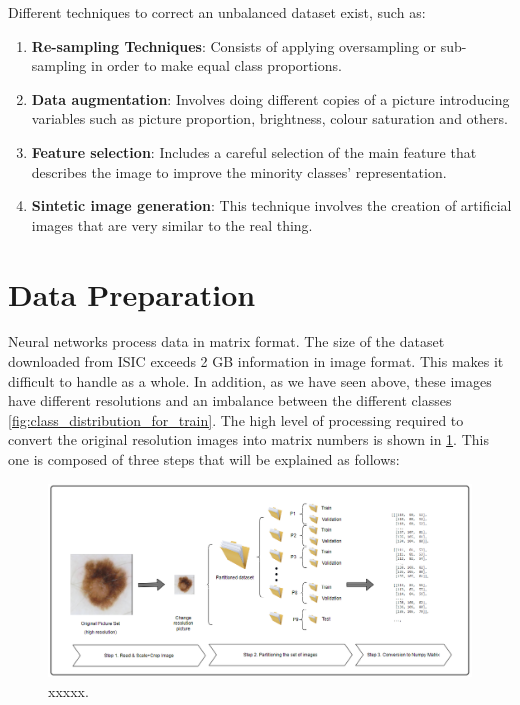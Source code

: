 Different techniques to correct an unbalanced dataset exist, such as: 
\begin{enumerate}
    \item \textbf{Re-sampling Techniques}: Consists of applying oversampling or sub-sampling in order to make equal class proportions.    
    \item \textbf{Data augmentation}: Involves doing different copies of a picture introducing variables such as picture proportion, brightness, colour saturation and others.
    \item \textbf{Feature selection}: Includes a careful selection of the main feature that describes the image to improve the minority classes' representation.
    \item \textbf{Sintetic image generation}: This technique involves the creation of artificial images that are very similar to the real thing.  

\end{enumerate}



     
\section{Data Preparation}
Neural networks process data in matrix format.  The size of the dataset downloaded from ISIC exceeds 2 GB information in image format. This makes it difficult to handle as a whole. In addition, as we have seen above, these images have different resolutions and an imbalance between the different classes \ref{fig:class_distribution_for_train}. The high level of processing required to convert the original resolution images into matrix numbers is shown in \ref{fig: Data preparation steps}. This one is composed of three steps that will be explained as follows:

\begin{figure}[ht]
    \begin{center}
        \includegraphics[scale=0.5]{images/Data_Preparation/TFM_DataPreparation_Image.png}
        \caption{xxxxx.}
    \label{fig: Data preparation steps}    
    \end{center}
\end{figure}

